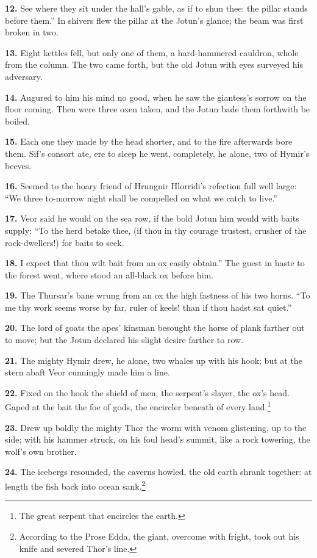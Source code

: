 \textbf{12.} See where they sit under the hall's gable, as if to shun thee:
the pillar stands before them.'' In shivers flew the pillar at the
Jotun's glance; the beam was first broken in two.

\textbf{13.} Eight kettles fell, but only one of them, a hard-hammered
cauldron, whole from the column. The two came forth, but the old Jotun
with eyes surveyed his adversary.

\textbf{14.} Augured to him his mind no good, when he saw the giantess's
sorrow on the floor coming. Then were three oxen taken, and the Jotun
bade them forthwith be boiled.

\textbf{15.} Each one they made by the head shorter, and to the fire
afterwards bore them. Sif's consort ate, ere to sleep he went,
completely, he alone, two of Hymir's beeves.

\textbf{16.} Seemed to the hoary friend of Hrungnir Hlorridi's refection full
well large: ``We three to-morrow night shall be compelled on what we
catch to live.''

\textbf{17.} Veor said he would on the sea row, if the bold Jotun him would
with baits supply: ``To the herd betake thee, (if thou in thy courage
trustest, crusher of the rock-dwellers!) for baits to seek.

\textbf{18.} I expect that thou wilt bait from an ox easily obtain.'' The
guest in haste to the forest went, where stood an all-black ox before
him.

\textbf{19.} The Thursar's bane wrung from an ox the high fastness of his two
horns. ``To me thy work seems worse by far, ruler of keels! than if
thou hadst sat quiet.''

\textbf{20.} The lord of goats the apes' kinsman besought the horse of plank
farther out to move; but the Jotun declared his slight desire farther
to row.

\textbf{21.} The mighty Hymir drew, he alone, two whales up with his hook;
but at the stern abaft Veor cunningly made him a line.

\textbf{22.} Fixed on the hook the shield of men, the serpent's slayer, the
ox's head. Gaped at the bait the foe of gods, the encircler beneath of
every land.\footnote{The great serpent that encircles the earth.}

\textbf{23.} Drew up boldly the mighty Thor the worm with venom glistening,
up to the side; with his hammer struck, on his foul head's summit,
like a rock towering, the wolf's own brother.

\textbf{24.} The icebergs resounded, the caverns howled, the old earth shrank
together: at length the fish back into ocean sank.\footnote{According to the Prose Edda, the giant, overcome with
fright, took out his knife and severed Thor's line.}

